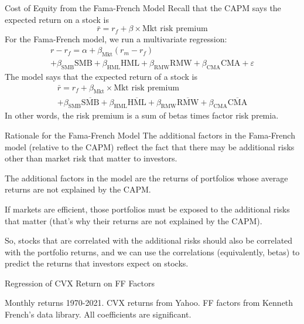 \documentclass[xcolor=dvipsnames,10pt]{beamer}
\begin{document}
\begin{frame}{Cost of Equity from the Fama-French Model}
    Recall that the CAPM says the expected return on a stock is
    $$\bar{r} = r_f + \beta \times \text{Mkt risk premium}$$
        For the Fama-French model, we run a multivariate regression:
   \begin{multline*}
   r-r_f = \alpha + \beta_{\text{Mkt}}(r_m-r_f) \\+ \beta_{\text{SMB}}\text{SMB}
    + \beta_{\text{HML}}\text{HML}
    + \beta_{\text{RMW}}\text{RMW}
    + \beta_{\text{CMA}}\text{CMA} + \varepsilon
    \end{multline*}
    The model says that the expected return of a stock is
    \begin{multline*}\bar{r} = r_f + \beta_{\text{Mkt}} \times \text{Mkt risk premium} \\+ \beta_{\text{SMB}}\overline{\text{SMB}}
    + \beta_{\text{HML}}\overline{\text{HML}}
    + \beta_{\text{RMW}}\overline{\text{RMW}}
    + \beta_{\text{CMA}}\overline{\text{CMA}}
    \end{multline*}
    In other words, the risk premium is a sum of betas times factor risk premia.  
\end{frame}

\begin{frame}{Rationale for the Fama-French Model}
   The additional factors in the Fama-French model (relative to the CAPM) reflect the fact that there may be additional risks other than market risk that matter to investors.  
   
   The additional factors in the model are the returns of portfolios whose average returns are not explained by the CAPM.
   
   If markets are efficient, those portfolios must be exposed to the additional risks that matter (that's why their returns are not explained by the CAPM).
   
   So, stocks that are correlated with the additional risks should also be correlated with the portfolio returns, and we can use the correlations (equivalently, betas) to predict the returns that investors expect on stocks.
\end{frame}

\begin{frame}{Regression of CVX Return on FF
Factors}
    \begin{center}
        
    \end{center}
Monthly returns 1970-2021.  CVX returns from Yahoo.  FF factors from Kenneth French's data library.  All coefficients are significant.
\end{frame}
\end{document}
